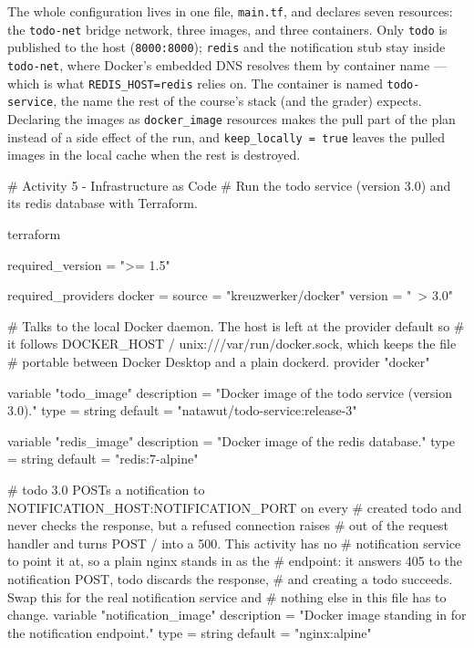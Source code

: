 \documentclass[a4paper, 10pt]{article}
\begin{document}
\begin{solution}
	The whole configuration lives in one file, \texttt{main.tf}, and declares seven
	resources: the \texttt{todo-net} bridge network, three images, and three
	containers. Only \texttt{todo} is published to the host
	(\texttt{8000:8000}); \texttt{redis} and the notification stub stay inside
	\texttt{todo-net}, where Docker's embedded DNS resolves them by container name ---
	which is what \texttt{REDIS\_HOST=redis} relies on. The container is named
	\texttt{todo-service}, the name the rest of the course's stack (and the grader)
	expects. Declaring the images as \texttt{docker\_image} resources makes the pull
	part of the plan instead of a side effect of the run, and
	\texttt{keep\_locally~=~true} leaves the pulled images in the local cache when the
	rest is destroyed.
	\begin{codingbox*}[language=HCL]
# Activity 5 - Infrastructure as Code
# Run the todo service (version 3.0) and its redis database with Terraform.

terraform {
  required_version = ">= 1.5"

  required_providers {
    docker = {
      source  = "kreuzwerker/docker"
      version = "~> 3.0"
    }
  }
}

# Talks to the local Docker daemon. The host is left at the provider default so
# it follows DOCKER_HOST / unix:///var/run/docker.sock, which keeps the file
# portable between Docker Desktop and a plain dockerd.
provider "docker" {}

variable "todo_image" {
  description = "Docker image of the todo service (version 3.0)."
  type        = string
  default     = "natawut/todo-service:release-3"
}

variable "redis_image" {
  description = "Docker image of the redis database."
  type        = string
  default     = "redis:7-alpine"
}

# todo 3.0 POSTs a notification to NOTIFICATION_HOST:NOTIFICATION_PORT on every
# created todo and never checks the response, but a refused connection raises
# out of the request handler and turns POST / into a 500. This activity has no
# notification service to point it at, so a plain nginx stands in as the
# endpoint: it answers 405 to the notification POST, todo discards the response,
# and creating a todo succeeds. Swap this for the real notification service and
# nothing else in this file has to change.
variable "notification_image" {
  description = "Docker image standing in for the notification endpoint."
  type        = string
  default     = "nginx:alpine"
}


\end{codingbox*}
\end{solution}
\end{document}
